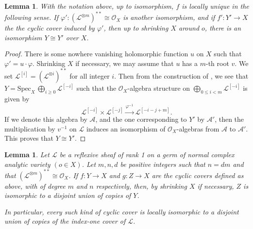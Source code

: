\documentclass[12pt]{amsart}
\newcommand{\<}{\leq}
\def\>{\geq}
\def\mcO{\mathcal{O}}
\def\mcL{\mathcal{L}}
\newtheorem{lemma}[theorem]{Lemma}
\theoremstyle{remark}
\theoremstyle{definition}
\theoremstyle{definition}
\numberwithin{equation}{section}
\theoremstyle{definition}
\theoremstyle{definition}
\begin{document}
\begin{lemma}
\label{lemma:unique-cyclic-cover} 
With the notation above, up to isomorphism,   $f$ is locally unique in the following sense. 
If $\varphi' \colon  (\mcL^{\otimes m})^{**} \cong \mcO_X $ is another isomorphism, and if $f'\colon Y' \to X$ the the cyclic cover induced by $\varphi'$, 
then up to shrinking $X$ around $o$, there is an isomorphism $Y\cong Y'$ over $X$.
\end{lemma}


\begin{proof} 
There is some nowhere vanishing holomorphic function $u$ on $X$ such that $\varphi' = u\cdot \varphi$. 
Shrinking $X$ if necessary, we may assume that $u$ has a $m$-th root $v$.  
We set $\mcL^{[i]} =  (\mcL^{\otimes i})^{**} $ for all integer $i$. 
Then from the construction of \cite[Definition 2.52]{KM98}, 
we see that $Y  = \mathrm{Spec}_X\, \bigoplus_{i \> 0 } \mcL^{[-i]}$ such that the $\mcO_X$-algebra structure on  $\bigoplus_{0\< i <m } \mcL^{[-i]}$ is given by 
\[
\mcL^{[-i]} \times \mcL^{[-j]} \overset{\varphi^{-1}}{\longrightarrow} \mcL^{[-i-j+m]}. 
\]
If we denote this algebra by $\mathcal{A}$, and the one corresponding to $Y'$ by $\mathcal{A}'$, then the multiplication by $v^{-1}$ on $\mcL$ induces an isomorphism of $\mcO_X$-algebras from $\mathcal{A}$ to $\mathcal{A}'$. 
This proves that $Y\cong Y'$. 
\end{proof}

 

\begin{lemma}
\label{lemma:cyclic-factor}
Let $\mcL$ be a reflexive sheaf of rank 1 on  a germ of normal complex analytic variety $(o\in X)$. 
Let $m,n,d$ be positive  integers such that $n=dm$ and that $(\mcL^{\otimes m})^{**} \cong \mcO_X$.  
If $f\colon Y \to X$ and $g \colon Z\to X$ are the  cyclic covers defined as above, with of degree $m$ and $n$ respectively, 
then, by shrinking $X$ if necessary, $Z$ is isomorphic to a disjoint union of copies of $Y$.  

In particular, every such kind of cyclic cover is locally isomorphic to a disjoint union of copies of the index-one cover of $\mcL$.
\end{lemma}
 

 
\end{document}
